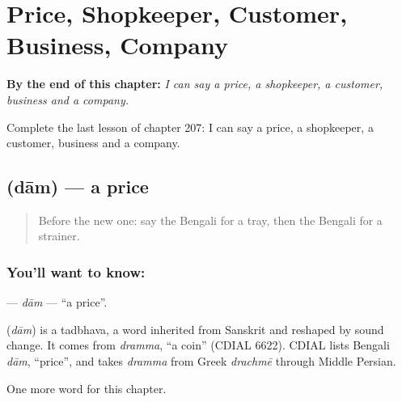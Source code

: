 
\chapter{Price, Shopkeeper, Customer, Business, Company}
\label{ch:bn-price-shopkeeper-customer-business-company}

\begin{chapteropening}
\textbf{By the end of this chapter:} \emph{I can say a price, a shopkeeper, a customer, business and a company.}

Complete the last lesson of chapter 207: I can say a price, a shopkeeper, a customer, business and a company.
\end{chapteropening}

\section[\texorpdfstring{\bn{দাম} (dām)}{দাম (dām)}]{ (dām) — a price}

\label{lesson:BN-C207-dam}



\begin{quote}
Before the new one: say the Bengali for a tray, then the Bengali for a strainer.
\end{quote}

\subsection*{You'll want to know: }
\textbf{} — \emph{dām} — \textquotedblleft{}a price\textquotedblright{}.

\begin{cousinweb}
\textbf{} (\emph{dām}) is a tadbhava, a word inherited from Sanskrit and reshaped by sound change. It comes from \emph{dramma}, \textquotedblleft{}a coin\textquotedblright{} (CDIAL 6622). CDIAL lists Bengali \emph{dām}, \textquotedblleft{}price\textquotedblright{}, and takes \emph{dramma} from Greek \emph{drachmē} through Middle Persian.
\end{cousinweb}

\begin{grammarlens}[title={What you've built}]
One more word for this chapter.
\end{grammarlens}

